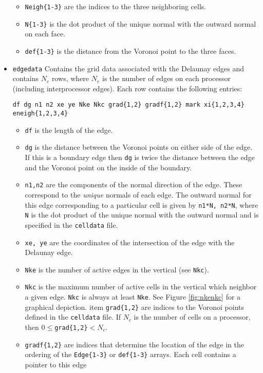 \documentclass[12pt,oneside]{article}
\begin{document}
\begin{itemize}
\begin{itemize}
\item \verb+Neigh{1-3}+ are the indices to the three neighboring cells.  
\item \verb+N{1-3}+ is the dot product of the unique normal with the outward normal on each
face.
\item \verb+def{1-3}+ is the distance from the Voronoi point to the three faces.
\end{itemize}
\item \verb+edgedata+ Contains the grid data associated with the Delaunay edges and contains
$N_e$ rows, where $N_e$ is the number of edges on each processor (including interprocessor edges).
Each row contains the following entries:
\begin{verbatim}
df dg n1 n2 xe ye Nke Nkc grad{1,2} gradf{1,2} mark xi{1,2,3,4} eneigh{1,2,3,4}
\end{verbatim}
\begin{itemize}
\item \verb+df+ is the length of the edge.
\item \verb+dg+ is the distance between the Voronoi points on either side of the edge.  If 
this is a boundary edge then \verb+dg+ is twice the distance between the edge and the Voronoi
point on the inside of the boundary.
\item \verb+n1,n2+ are the components of the normal direction of the edge.  These correspond
to the {\it unique} normals of each edge.  The outward normal for this edge corresponding to
a particular cell is given by \verb+n1*N, n2*N+, where \verb+N+ is the dot product of the
unique normal with the outward normal and is specified in the \verb+celldata+ file.
\item \verb+xe, ye+ are the coordinates of the intersection of the edge with the Delaunay
edge.  
\item \verb+Nke+ is the number of active edges in the vertical (see \verb+Nkc+).
\item \verb+Nkc+ is the maximum number of active cells in the vertical which neighbor a given edge.  \verb+Nkc+ is
always at least \verb+Nke+.  See Figure \ref{fig:nkenkc} for a graphical depiction.
item \verb+grad{1,2}+ are indices to the Voronoi points defined in the \verb+celldata+ file.
If $N_c$ is the number of cells on a processor, then $0\le$\verb+grad{1,2}+$<N_c$.
\item \verb+gradf{1,2}+ are indices that determine the location of the edge in the ordering
of the \verb+Edge{1-3}+ or \verb+def{1-3}+ arrays.  Each cell contains a pointer to this edge

\end{itemize}
\end{itemize}
\end{document}
